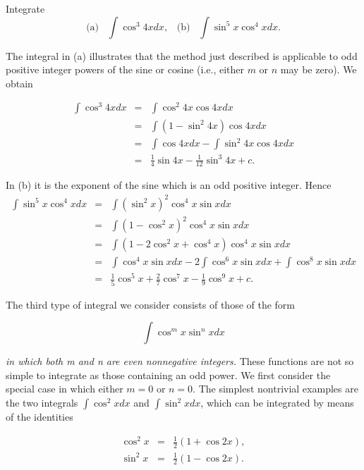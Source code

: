 \begin{example}
Integrate
$$
\mbox{(a)}\;\;\; \int \cos^{3}4x dx, \;\;\;          \mbox{(b)}\;\;\; \int \sin^{5}x \cos^{4}x dx.
$$

The integral in (a) illustrates that the method just described is applicable to odd positive
integer powers of the sine or cosine (i.e., either $m$ or $n$ may be zero). We obtain

\begin{eqnarray*}
\int \cos^{3}4x dx &=& \int \cos^{2}4x \cos 4x dx\\
&=& \int(1- \sin^{2}4x) \cos 4x dx \\
&=& \int \cos 4x dx - \int \sin^{2}4x \cos 4x dx\\
&=& \frac{1}{4} \sin 4x - \frac{1}{12} \sin^{3} 4x + c.
\end{eqnarray*}

In (b) it is the exponent of the sine which is an odd positive
integer.
Hence
\begin{eqnarray*}
\int \sin^{5}x \cos^{4}x dx &=& \int (\sin^{2} x)^{2} \cos^{4}x \sin x dx\\
&=& \int (1- \cos^{2}x)^{2} \cos^{4}x \sin x dx\\ 
&=& \int (1 - 2 \cos^{2} x + \cos^{4}x) \cos^{4}x \sin x dx\\ 
&=& \int \cos^{4}x \sin x dx - 2\int \cos^{6}x \sin x dx + \int \cos^{8}x \sin x dx\\
&=& \frac{1}{5} \cos^{5}x + \frac{2}{7} \cos^{7}x - \frac{1}{9} \cos^{9}x + c. 
\end{eqnarray*}
\end{example}

The third type of integral we consider consists of those of the form


\begin{equation}
\int \cos^{m}x \sin^{n}x dx   
\label{eq7.2.3}
\end{equation}

\noindent \textit{in which both m and n are even nonnegative integers.}  These functions are not so simple to integrate as those containing an odd power. We first consider the special case in which either $m = 0$ or $n = 0$. The simplest nontrivial examples are the two integrals 
$\int \cos^{2}x dx$ and $\int \sin^{2}x dx$, which can be integrated by means of the identities

\begin{eqnarray*}
\cos^{2}x &=& \frac{1}{2}(1 + \cos 2x), \\
\sin^{2}x &=& \frac{1}{2}(1- \cos 2x).
\end{eqnarray*}

